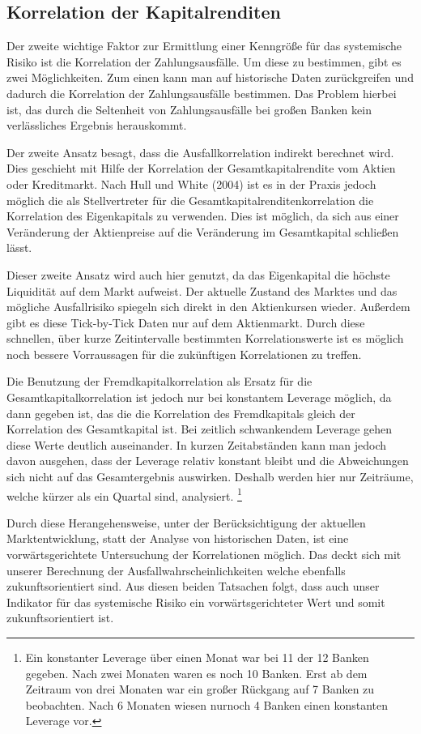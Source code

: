 \documentclass[a4paper,12pt]{scrartcl}
\begin{document}
\subsection{Korrelation der Kapitalrenditen}
Der zweite wichtige Faktor zur Ermittlung einer Kenngröße für das systemische Risiko ist die Korrelation der Zahlungsausfälle. Um diese zu bestimmen, gibt es zwei Möglichkeiten. Zum einen kann man auf historische Daten zurückgreifen und dadurch die Korrelation der Zahlungsausfälle bestimmen. Das Problem hierbei ist, das durch die Seltenheit von Zahlungsausfälle bei großen Banken kein verlässliches Ergebnis herauskommt. 

Der zweite Ansatz besagt, dass die Ausfallkorrelation indirekt berechnet wird. Dies geschieht mit Hilfe der Korrelation der Gesamtkapitalrendite vom Aktien oder Kreditmarkt. Nach Hull und White (2004) ist es in der Praxis jedoch möglich die als Stellvertreter für die Gesamtkapitalrenditenkorrelation die Korrelation des Eigenkapitals zu verwenden. Dies ist möglich, da sich aus einer Veränderung der Aktienpreise auf die Veränderung im Gesamtkapital schließen lässt.

Dieser zweite Ansatz wird auch hier genutzt, da das Eigenkapital die höchste Liquidität auf dem Markt aufweist. Der aktuelle Zustand des Marktes und das mögliche Ausfallrisiko spiegeln sich direkt in den Aktienkursen wieder. Außerdem gibt es diese Tick-by-Tick Daten nur auf dem Aktienmarkt. 
Durch diese schnellen, über kurze Zeitintervalle bestimmten Korrelationswerte ist es möglich noch bessere Vorraussagen für die zukünftigen Korrelationen zu treffen. 

Die Benutzung der Fremdkapitalkorrelation als Ersatz für die Gesamtkapitalkorrelation ist jedoch nur bei konstantem Leverage möglich, da dann gegeben ist, das die die Korrelation des Fremdkapitals gleich der Korrelation des Gesamtkapital ist. Bei zeitlich schwankendem Leverage gehen diese Werte deutlich auseinander. 
In kurzen Zeitabständen kann man jedoch davon ausgehen, dass der Leverage relativ konstant bleibt und die Abweichungen sich nicht auf das Gesamtergebnis auswirken. Deshalb werden hier nur Zeiträume, welche kürzer als ein Quartal sind, analysiert. \footnote{Ein konstanter Leverage über einen Monat war bei 11 der 12 Banken gegeben. Nach zwei Monaten waren es noch 10 Banken. Erst ab dem Zeitraum von drei Monaten war ein großer Rückgang auf 7 Banken zu beobachten. Nach 6 Monaten wiesen nurnoch 4 Banken einen konstanten Leverage vor.}


Durch diese Herangehensweise, unter der Berücksichtigung der aktuellen Marktentwicklung, statt der Analyse von historischen Daten, ist eine vorwärtsgerichtete Untersuchung der Korrelationen möglich. Das deckt sich mit unserer Berechnung der Ausfallwahrscheinlichkeiten welche ebenfalls zukunftsorientiert sind. Aus diesen beiden Tatsachen folgt, dass auch unser Indikator für das systemische Risiko ein vorwärtsgerichteter Wert und somit zukunftsorientiert ist.
\end{document}
